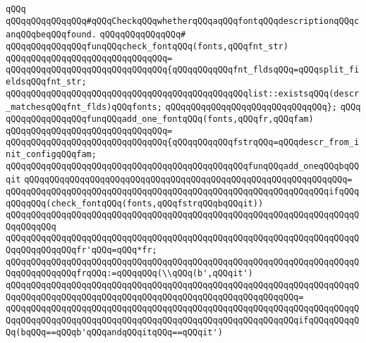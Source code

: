 \verb|qQQq|\newline
\verb|qQQqqQQqqQQqqQQq#qQQqCheckqQQqwhetherqQQqaqQQqfontqQQqdescriptionqQQqcanqQQqbeqQQqfound.|\newline
\verb|qQQqqQQqqQQqqQQq#|\newline
\verb|qQQqqQQqqQQqqQQqfunqQQqcheck_fontqQQq(fonts,qQQqfnt_str)|\newline
\verb|qQQqqQQqqQQqqQQqqQQqqQQqqQQqqQQq=|\newline
\verb|qQQqqQQqqQQqqQQqqQQqqQQqqQQqqQQq{qQQqqQQqqQQqfnt_fldsqQQq=qQQqsplit_fieldsqQQqfnt_str;|\newline
\verb|qQQqqQQqqQQqqQQqqQQqqQQqqQQqqQQqqQQqqQQqqQQqqQQqlist::existsqQQq(descr_matchesqQQqfnt_flds)qQQqfonts;|\newline
\verb|qQQqqQQqqQQqqQQqqQQqqQQqqQQqqQQq};|\newline
\verb|qQQq|\newline
\verb|qQQqqQQqqQQqqQQqfunqQQqadd_one_fontqQQq(fonts,qQQqfr,qQQqfam)|\newline
\verb|qQQqqQQqqQQqqQQqqQQqqQQqqQQqqQQq=|\newline
\verb|qQQqqQQqqQQqqQQqqQQqqQQqqQQqqQQq{qQQqqQQqqQQqfstrqQQq=qQQqdescr_from_init_configqQQqfam;|\newline
\newline
\verb|qQQqqQQqqQQqqQQqqQQqqQQqqQQqqQQqqQQqqQQqqQQqqQQqfunqQQqadd_oneqQQqbqQQqit|\newline
\verb|qQQqqQQqqQQqqQQqqQQqqQQqqQQqqQQqqQQqqQQqqQQqqQQqqQQqqQQqqQQqqQQq=|\newline
\verb|qQQqqQQqqQQqqQQqqQQqqQQqqQQqqQQqqQQqqQQqqQQqqQQqqQQqqQQqqQQqqQQqifqQQqqQQqqQQq(check_fontqQQq(fonts,qQQqfstrqQQqbqQQqit))|\newline
\verb|qQQqqQQqqQQqqQQqqQQqqQQqqQQqqQQqqQQqqQQqqQQqqQQqqQQqqQQqqQQqqQQqqQQqqQQqqQQqqQQq|\newline
\verb|qQQqqQQqqQQqqQQqqQQqqQQqqQQqqQQqqQQqqQQqqQQqqQQqqQQqqQQqqQQqqQQqqQQqqQQqqQQqqQQqqQQqfr'qQQq=qQQq*fr;|\newline
\newline
\verb|qQQqqQQqqQQqqQQqqQQqqQQqqQQqqQQqqQQqqQQqqQQqqQQqqQQqqQQqqQQqqQQqqQQqqQQqqQQqqQQqqQQqfrqQQq:=qQQqqQQq(\\qQQq(b',qQQqit')|\newline
\verb|qQQqqQQqqQQqqQQqqQQqqQQqqQQqqQQqqQQqqQQqqQQqqQQqqQQqqQQqqQQqqQQqqQQqqQQqqQQqqQQqqQQqqQQqqQQqqQQqqQQqqQQqqQQqqQQqqQQqqQQqqQQqqQQq=|\newline
\verb|qQQqqQQqqQQqqQQqqQQqqQQqqQQqqQQqqQQqqQQqqQQqqQQqqQQqqQQqqQQqqQQqqQQqqQQqqQQqqQQqqQQqqQQqqQQqqQQqqQQqqQQqqQQqqQQqqQQqqQQqqQQqqQQqifqQQqqQQqqQQq(bqQQq==qQQqb'qQQqandqQQqitqQQq==qQQqit')|\newline

